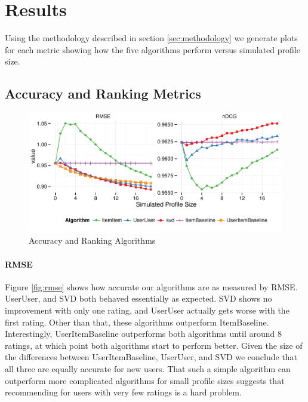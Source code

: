 \documentclass[letterpaper]{sig-alternate}
\begin{document}
\section{Results}

  Using the methodology described in section \ref{sec:methodology} we generate plots for each metric showing how the five algorithms perform versus simulated profile size.

  
\subsection*{Accuracy and Ranking Metrics}

\vspace{-1.5em}
 
\begin{figure}[ht!]
  \centering
  \includegraphics[width=0.75\linewidth]{../lenskit/output/ekstrandTuned20/accuracy.pdf}
  \caption{Accuracy and Ranking Algorithms}
  \label{fig:rmse}
  \label{fig:ndcg}
\end{figure}
  \paragraph{RMSE}
  Figure \ref{fig:rmse} shows how accurate our algorithms are as measured by RMSE.
  UserUser, and SVD both behaved essentially as expected.
  SVD shows no improvement with only one rating, and UserUser actually gets worse with the first rating.
  Other than that, these algorithms outperform ItemBaseline.
  Interestingly, UserItemBaseline outperforms both algorithms until around 8 ratings, at which point both algorithms start to perform better.
  Given the size of the differences between UserItemBaseline, UserUser, and SVD we conclude that all three are equally accurate for new users.
  That such a simple algorithm can outperform more complicated algorithms for small profile sizes suggests that recommending for users with very few ratings is a hard problem.
  
\end{document}
